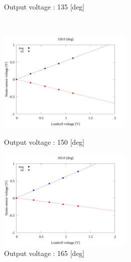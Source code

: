 \begin{figure}
\begin{minipage}[b]{0.45\linewidth}
        \caption{Output voltage : 135 [deg]}
      \end{minipage}\\
      \begin{minipage}[b]{0.45\linewidth}
        \centering
        \includegraphics[width=65mm]{../../02_workspace/result/2-1/plot/04/04_linear_1500.png}
        \caption{Output voltage : 150 [deg]}
      \end{minipage} 
      \begin{minipage}[b]{0.45\linewidth}
        \centering
        \includegraphics[width=65mm]{../../02_workspace/result/2-1/plot/04/04_linear_1650.png}
        \caption{Output voltage : 165 [deg]}
      \end{minipage}
    \end{figure}

